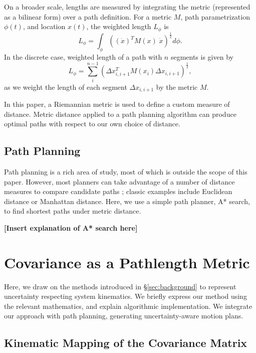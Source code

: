 \documentclass[10pt,conference]{ieeeconf}
\begin{document}
On a broader scale, lengths are measured by integrating the metric (represented as a bilinear form) over a path definition.
For a metric $M$, path parametrization $\phi(t)$, and location $x(t)$, the weighted length $L_\phi$ is
\begin{equation}
    L_\phi = \int_\phi \left((\dot{x})^T M(x)\;\dot{x}\right)^\frac{1}{2} d\phi.
\end{equation}
In the discrete case, weighted length of a path with $n$ segments is given by
\begin{equation}
    L_\phi = \sum_i^{n-1} \left(\Delta x_{i, i+1}^T M(x_i) \Delta x_{i, i+1}\right)^\frac{1}{2},
\end{equation}
as we weight the length of each segment $\Delta x_{i,i+1}$ by the metric $M$.

In this paper, a Riemannian metric is used to define a custom measure of distance.
Metric distance applied to a path planning algorithm can produce optimal paths with respect to our own choice of distance.

\subsection{Path Planning}
Path planning is a rich area of study, most of which is outside the scope of this paper.
However, most planners can take advantage of a number of distance measures to compare candidate paths \cite{something?}; classic examples include Euclidean distance or Manhattan distance.
Here, we use a simple path planner, A* search, to find shortest paths under metric distance.

\noindent\textbf{[Insert explanation of A* search here]}

\section{Covariance as a Pathlength Metric}\label{sec:methods}
Here, we draw on the methods introduced in \S\ref{sec:background} to represent uncertainty respecting system kinematics.
We briefly express our method using the relevant mathematics, and explain algorithmic implementation.
We integrate our approach with path planning, generating uncertainty-aware motion plans.
\subsection{Kinematic Mapping of the Covariance Matrix}
\end{document}

